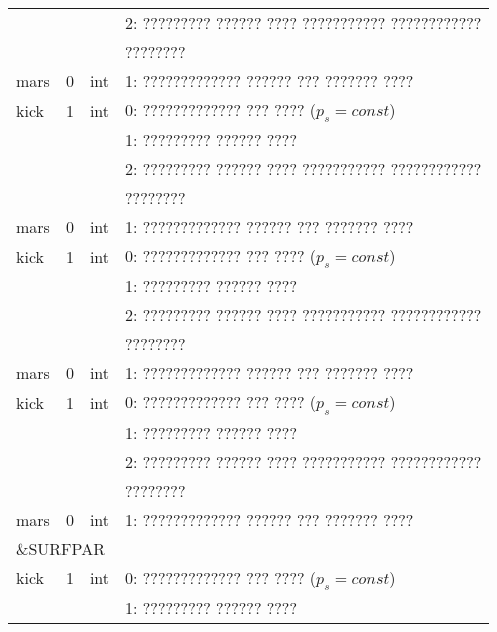 \begin{longtable}[c]{|l|c|l|l|}
             &        &     & 2: ????????? ?????? ???? ??????????? ???????????? \\
             &        &     & ????????                                          \\
    mars     & 0      & int & 1: ????????????? ?????? ??? ??????? ????          \\
    kick     & 1      & int & 0: ????????????? ??? ???? (\(p_s = const\))       \\
             &        &     & 1: ????????? ?????? ????                          \\
             &        &     & 2: ????????? ?????? ???? ??????????? ???????????? \\
             &        &     & ????????                                          \\
    mars     & 0      & int & 1: ????????????? ?????? ??? ??????? ????          \\
    kick     & 1      & int & 0: ????????????? ??? ???? (\(p_s = const\))       \\
             &        &     & 1: ????????? ?????? ????                          \\
             &        &     & 2: ????????? ?????? ???? ??????????? ???????????? \\
             &        &     & ????????                                          \\
    mars     & 0      & int & 1: ????????????? ?????? ??? ??????? ????          \\
    kick     & 1      & int & 0: ????????????? ??? ???? (\(p_s = const\))       \\
             &        &     & 1: ????????? ?????? ????                          \\
             &        &     & 2: ????????? ?????? ???? ??????????? ???????????? \\
             &        &     & ????????                                          \\
    mars     & 0      & int & 1: ????????????? ?????? ??? ??????? ????          \\
    \hline
    \multicolumn{4}{|l|}{\&SURFPAR}                                             \\ \hline
    kick     & 1      & int & 0: ????????????? ??? ???? (\(p_s = const\))       \\
             &        &     & 1: ????????? ?????? ????                          \\

\end{longtable}
